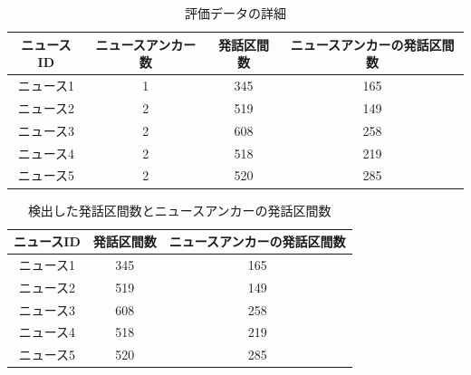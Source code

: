 \begin{table}[H]
  \begin{center}
    \caption{評価データの詳細 \label{table:test_detail}}
    \begin{tabular}{|c||c|c|c|} \hline
ニュースID & ニュースアンカー数 & 発話区間数 & ニュースアンカーの発話区間数 \\ \hline
ニュース1  & 1 & 345 & 165 \\ \hline
ニュース2  & 2 & 519 & 149 \\ \hline
ニュース3  & 2 & 608 & 258 \\ \hline
ニュース4  & 2 & 518 & 219 \\ \hline
ニュース5  & 2 & 520 & 285 \\ \hline
    \end{tabular}
  \end{center}
\end{table}

\begin{table}[H]
  \begin{center}
    \caption{検出した発話区間数とニュースアンカーの発話区間数 \label{table:num_of_anchor}}
    \begin{tabular}{|c||c|c|} \hline
ニュースID & 発話区間数 & ニュースアンカーの発話区間数 \\ \hline
ニュース1  & 345   & 165 \\ \hline
ニュース2  & 519   & 149 \\ \hline
ニュース3  & 608   & 258 \\ \hline
ニュース4  & 518   & 219 \\ \hline
ニュース5  & 520   & 285 \\ \hline
    \end{tabular}
  \end{center}
\end{table}



